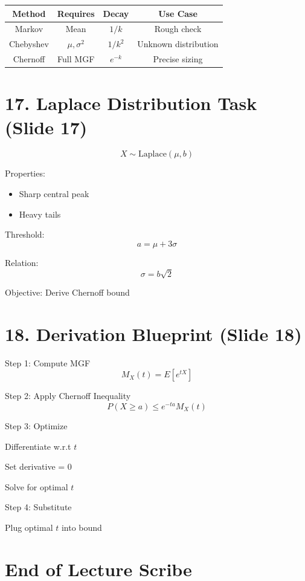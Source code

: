 \documentclass[12pt]{article}
\begin{document}
\begin{tabular}{|c|c|c|c|}
\hline
Method & Requires & Decay & Use Case \\
\hline
Markov & Mean & $1/k$ & Rough check \\
Chebyshev & $\mu, \sigma^2$ & $1/k^2$ & Unknown distribution \\
Chernoff & Full MGF & $e^{-k}$ & Precise sizing \\
\hline
\end{tabular}

\section*{17. Laplace Distribution Task (Slide 17)}

\[
X \sim \text{Laplace}(\mu, b)
\]

Properties:
\begin{itemize}
\item Sharp central peak
\item Heavy tails
\end{itemize}

Threshold:
\[
a = \mu + 3\sigma
\]

Relation:
\[
\sigma = b\sqrt{2}
\]

Objective: Derive Chernoff bound

\section*{18. Derivation Blueprint (Slide 18)}

Step 1: Compute MGF
\[
M_X(t) = E[e^{tX}]
\]

Step 2: Apply Chernoff Inequality
\[
P(X \ge a) \le e^{-ta} M_X(t)
\]

Step 3: Optimize

Differentiate w.r.t $t$

Set derivative = 0

Solve for optimal $t$

Step 4: Substitute

Plug optimal $t$ into bound

\section*{End of Lecture Scribe}
\end{document}
